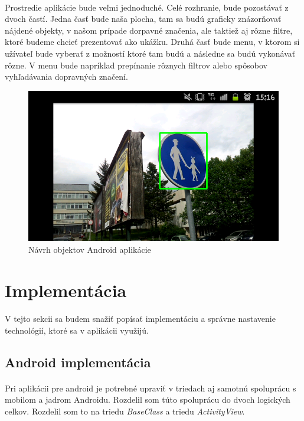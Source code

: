 \documentclass[12pt]{article}
\begin{document}
\paragraph{}
Prostredie aplikácie bude veľmi jednoduché. Celé rozhranie, bude pozostávať z dvoch častí. Jedna časť bude naša plocha, tam sa budú graficky znázorňovať nájdené objekty, v našom prípade dorpavné značenia, ale taktiež aj rôzne filtre, ktoré budeme chcieť prezentovať ako ukážku.
Druhá časť bude menu, v ktorom si užívateľ bude vyberať z možností ktoré tam budú a následne sa budú vykonávať rôzne. V menu bude napríklad prepínanie rôznych filtrov alebo spôsobov vyhľadávania dopravných značení.
\begin{figure}[p]
\centering
\includegraphics[width=1\textwidth,natwidth=400,natheight=240]{gui.png}
\vspace{-10pt}
\caption{Návrh objektov Android aplikácie}
\vspace{-10pt}
\label{uml_objects_diagram}
\end{figure}
\section{Implementácia}
\paragraph{}
V tejto sekcii sa budem snažiť popísať implementáciu a správne nastavenie technológií, ktoré sa v aplikácii využijú.
\subsection{Android implementácia}
\paragraph{}
Pri aplikácii pre android je potrebné upraviť v triedach aj samotnú spoluprácu s mobilom a jadrom Androidu. Rozdelil som túto spoluprácu do dvoch logických celkov. Rozdelil som to na triedu \emph{BaseClass} a triedu \emph{ActivityView}.
\end{document}
